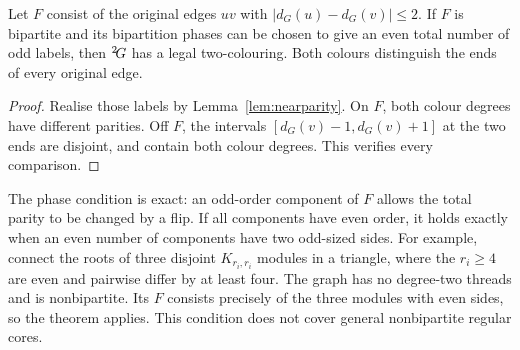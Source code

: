 \begin{theorem}[A6]\label{thm:gapparity}
Let $F$ consist of the original edges $uv$ with
$|d_G(u)-d_G(v)|\le2$. If $F$ is bipartite and its bipartition
phases can be chosen to give an even total number of odd labels,
then ${}^{2}\!G$ has a legal two-colouring. Both colours distinguish
the ends of every original edge.
\end{theorem}
\begin{proof}
Realise those labels by Lemma~\ref{lem:nearparity}. On $F$, both
colour degrees have different parities. Off $F$, the intervals
$[d_G(v)-1,d_G(v)+1]$ at the two ends are disjoint, and contain
both colour degrees. This verifies every comparison.
\end{proof}

The phase condition is exact: an odd-order component of $F$ allows
the total parity to be changed by a flip. If all components have even
order, it holds exactly when an even number of components have two
odd-sized sides. For example, connect the roots of three disjoint
$K_{r_i,r_i}$ modules in a triangle, where the $r_i\ge4$ are even
and pairwise differ by at least four. The graph has no degree-two
threads and is nonbipartite. Its $F$ consists precisely of the three
modules with even sides, so the theorem applies. This condition does
not cover general nonbipartite regular cores.
